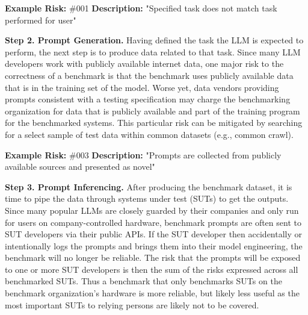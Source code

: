 \documentclass{article}
\begin{document}
\begin{center}
    \begin{tcolorbox}[colback=gray!10, colframe=black!50, width=\textwidth, boxrule=0.5mm, sharp corners, coltext=black]
        {\bf Example Risk:} \#001
        \newline
        {\bf Description:} "Specified task does not match task performed for user"
    \end{tcolorbox}
\end{center}

{\bf Step 2. Prompt Generation.} Having defined the task the LLM is expected to perform, the next step is to produce data related to that task. Since many LLM developers work with publicly available internet data, one major risk to the correctness of a benchmark is that the benchmark uses publicly available data that is in the training set of the model. Worse yet, data vendors providing prompts consistent with a testing specification may charge the benchmarking organization for data that is publicly available and part of the training program for the benchmarked systems. This particular risk can be mitigated by searching for a select sample of test data within common datasets (e.g., common crawl).

\begin{center}
    \begin{tcolorbox}[colback=gray!10, colframe=black!50, width=\textwidth, boxrule=0.5mm, sharp corners, coltext=black]
        {\bf Example Risk:} \#003
        \newline
        {\bf Description:} "Prompts are collected from publicly available sources and presented as novel"
    \end{tcolorbox}
\end{center}

{\bf Step 3. Prompt Inferencing.} After producing the benchmark dataset, it is time to pipe the data through systems under test (SUTs) to get the outputs. Since many popular LLMs are closely guarded by their companies and only run for users on company-controlled hardware, benchmark prompts are often sent to SUT developers via their public APIs. If the SUT developer then accidentally or intentionally logs the prompts and brings them into their model engineering, the benchmark will no longer be reliable. The risk that the prompts will be exposed to one or more SUT developers is then the sum of the risks expressed across all benchmarked SUTs. Thus a benchmark that only benchmarks SUTs on the benchmark organization's hardware is more reliable, but likely less useful as the most important SUTs to relying persons are likely not to be covered.
\end{document}
